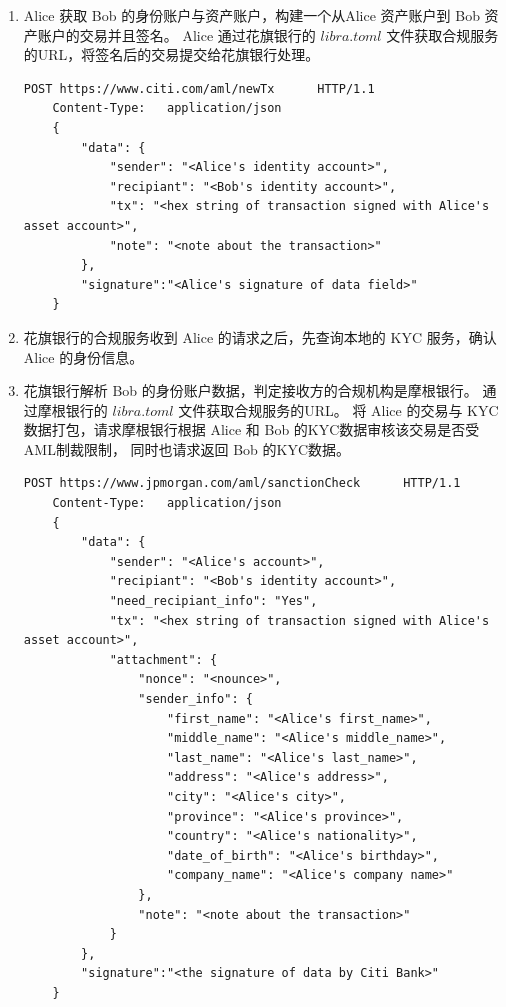 \begin{enumerate}
    \item Alice 获取 Bob 的身份账户与资产账户，构建一个从Alice 资产账户到 Bob 资产账户的交易并且签名。
    Alice 通过花旗银行的 $libra.toml$ 文件获取合规服务的URL，将签名后的交易提交给花旗银行处理。
    
    \begin{lstlisting}[caption={Alice 请求花旗银行审核交易}, label={lst:alice_request}]
    POST https://www.citi.com/aml/newTx      HTTP/1.1
    Content-Type:   application/json
    {
        "data": {
            "sender": "<Alice's identity account>",
            "recipiant": "<Bob's identity account>",
            "tx": "<hex string of transaction signed with Alice's asset account>",
            "note": "<note about the transaction>"
        },
        "signature":"<Alice's signature of data field>"
    }
    \end{lstlisting}

    \item 花旗银行的合规服务收到 Alice 的请求之后，先查询本地的 KYC 服务，确认 Alice 的身份信息。

    \item 花旗银行解析 Bob 的身份账户数据，判定接收方的合规机构是摩根银行。
    通过摩根银行的 $libra.toml$ 文件获取合规服务的URL。
    将 Alice 的交易与 KYC 数据打包，请求摩根银行根据 Alice 和 Bob 的KYC数据审核该交易是否受AML制裁限制， 同时也请求返回 Bob 的KYC数据。

    \begin{lstlisting}[caption={花旗银行请求摩根银行审核交易}, label={lst:citi_request}]
    POST https://www.jpmorgan.com/aml/sanctionCheck      HTTP/1.1
    Content-Type:   application/json
    {
        "data": {
            "sender": "<Alice's account>",
            "recipiant": "<Bob's identity account>",
            "need_recipiant_info": "Yes",
            "tx": "<hex string of transaction signed with Alice's asset account>",
            "attachment": {
                "nonce": "<nounce>",
                "sender_info": {
                    "first_name": "<Alice's first_name>",
                    "middle_name": "<Alice's middle_name>",
                    "last_name": "<Alice's last_name>",
                    "address": "<Alice's address>",
                    "city": "<Alice's city>",
                    "province": "<Alice's province>",
                    "country": "<Alice's nationality>",
                    "date_of_birth": "<Alice's birthday>",
                    "company_name": "<Alice's company name>"
                },
                "note": "<note about the transaction>"
            }
        },
        "signature":"<the signature of data by Citi Bank>"
    }
    \end{lstlisting}


\end{enumerate}
